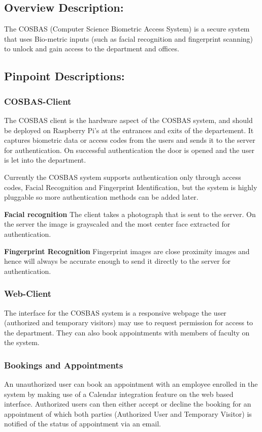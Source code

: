 \subsection{Overview Description:}
	The COSBAS (Computer Science Biometric Access System) is a secure system that uses Bio-metric inputs (such as facial recognition and fingerprint scanning) to unlock and gain access to the department and offices.
	
\subsection{Pinpoint Descriptions:}
	\subsubsection{COSBAS-Client}
	The COSBAS client is the hardware aspect of the COSBAS system, and should be deployed on  Raspberry Pi's at the entrances and exits of the departement.  It captures biometric data or access codes from the users and sends it to the server for authentication. On successful authentication the door is opened and the user is let into the department. 
	
	Currently the COSBAS system supports authentication only through access codes, Facial Recognition and Fingerprint Identification, but the system is highly pluggable so more  authentication methods can be added later. 
	
	\textbf{Facial recognition}
	The client takes a photograph that is sent to the server. On the server the image is grayscaled and the most center face extracted for authentication. 
	
	\textbf{Fingerprint Recognition}
	Fingerprint images are close proximity images and hence will always be accurate enough to send it directly to the server for authentication.
	
	\subsubsection{Web-Client}
	The interface for the COSBAS system is a responsive webpage the user (authorized and temporary visitors) may use to request permission for access to the department. They can also book appointments with members of faculty on the system.
	
	\subsubsection{Bookings and Appointments}
	An unauthorized user can book an appointment with an employee enrolled in the system by making use of a Calendar integration feature on the web based interface. Authorized users can then either accept or decline the booking for an appointment of which both parties (Authorized User and Temporary Visitor) is notified of the status of appointment via an email.
	
